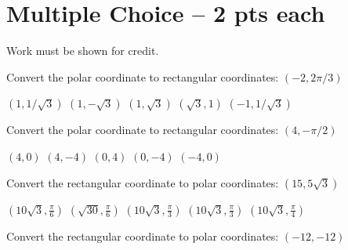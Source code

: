 \documentclass[11pt]{exam}
\begin{document}
\section*{Multiple Choice -- 2 pts each}
{\large Work must be shown for credit.}
\vspace{2ex}
\begin{questions}
	\begin{minipage}{\linewidth}
		\question Convert the polar coordinate to rectangular coordinates: $(-2, 2\pi/3)$

\begin{choices}
	\choice $\left(1,1/\sqrt{3}\right)$
	\CorrectChoice $\left(1,-\sqrt{3}\right)$
	\choice $\left(1,\sqrt{3}\right)$
	\choice $\left(\sqrt{3},1\right)$
	\choice $\left(-1,1/\sqrt{3}\right)$

\end{choices} \answerline
\end{minipage}

\begin{minipage}{\linewidth}
\question Convert the polar coordinate to rectangular coordinates: $(4,-\pi/2)$

\begin{choices}
	\choice $\left(4,0\right)$
	\choice $\left(4,-4\right)$
	\choice $\left(0,4\right)$
	\CorrectChoice $\left(0,-4\right)$
	\choice $\left(-4,0\right)$
\end{choices} \answerline
\end{minipage}

\begin{minipage}{\linewidth}



\question Convert the rectangular coordinate to polar coordinates: $(15, 5\sqrt{3})$

\begin{choices}
	\CorrectChoice $\left(10 \sqrt{3},\frac{\pi }{6}\right)$
	\choice $\left(\sqrt{30},\frac{\pi }{6}\right)$
	\choice $\left(10 \sqrt{3},\frac{\pi }{3}\right)$
	\choice $\left(10 \sqrt{3},\frac{\pi }{3}\right)$
	\choice $\left(10 \sqrt{3},\frac{\pi }{4}\right)$

\end{choices} \answerline
\end{minipage}

\begin{minipage}{\linewidth}



\question Convert the rectangular coordinate to polar coordinates: $(-12, -12)$


\end{minipage}
\end{questions}
\end{document}
